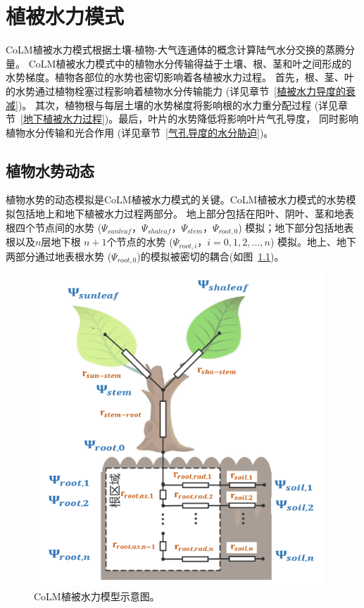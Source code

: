 \chapter{植被水力模式}

CoLM植被水力模式根据土壤-植物-大气连通体的概念计算陆气水分交换的蒸腾分量。
CoLM植被水力模式中的植物水分传输得益于土壤、根、茎和叶之间形成的水势梯度。植物各部位的水势也密切影响着各植被水力过程。
首先，根、茎、叶的水势通过植物栓塞过程影响着植物水分传输能力 (详见章节~\ref{植被水力导度的衰减})。
其次，植物根与每层土壤的水势梯度将影响根的水力重分配过程 (详见章节~\ref{地下植被水力过程})。最后，叶片的水势降低将影响叶片气孔导度，
同时影响植物水分传输和光合作用 (详见章节~\ref{气孔导度的水分胁迫})。


\section{植物水势动态}\label{植物水势动态}
植物水势的动态模拟是CoLM植被水力模式的关键。CoLM植被水力模式的水势模拟包括地上和地下植被水力过程两部分。
地上部分包括在阳叶、阴叶、茎和地表根四个节点间的水势 ($\Psi_{sunleaf}$，$\Psi_{shaleaf}$，$\Psi_{stem}$，$\Psi_{root,0}$)
%
 模拟；地下部分包括地表根以及$n$层地下根 $n+1$个节点的水势 ($\Psi_{root,i}$，$i=0,1,2,\ldots,n$) 模拟。地上、地下两部分通过地表根水势
 ($\Psi_{root,0}$)的模拟被密切的耦合(如图~\ref{fig:CoLM植被水力模型示意图})。

{
\begin{figure}[htbp]
\centering
\includegraphics{Figures/植被水力模式/CoLM植被水力模型示意图.png}
\caption{CoLM植被水力模型示意图。}
\label{fig:CoLM植被水力模型示意图}
\end{figure}
}


